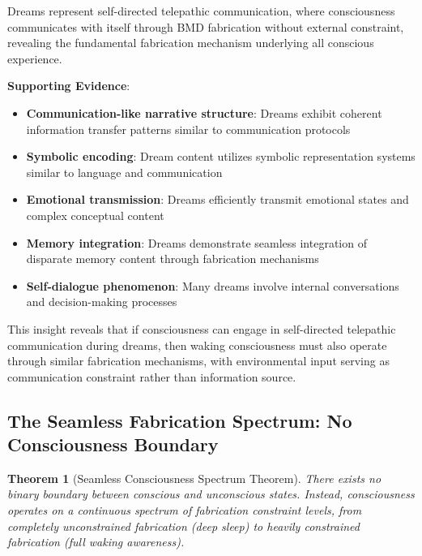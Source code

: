 \documentclass[12pt,a4paper]{article}
\newtheorem{theorem}{Theorem}[section]
\begin{document}
\begin{hypothesis}
Dreams represent self-directed telepathic communication, where consciousness communicates with itself through BMD fabrication without external constraint, revealing the fundamental fabrication mechanism underlying all conscious experience.
\end{hypothesis}

\textbf{Supporting Evidence}:
\begin{itemize}
\item \textbf{Communication-like narrative structure}: Dreams exhibit coherent information transfer patterns similar to communication protocols
\item \textbf{Symbolic encoding}: Dream content utilizes symbolic representation systems similar to language and communication
\item \textbf{Emotional transmission}: Dreams efficiently transmit emotional states and complex conceptual content  
\item \textbf{Memory integration}: Dreams demonstrate seamless integration of disparate memory content through fabrication mechanisms
\item \textbf{Self-dialogue phenomenon}: Many dreams involve internal conversations and decision-making processes
\end{itemize}

This insight reveals that if consciousness can engage in self-directed telepathic communication during dreams, then waking consciousness must also operate through similar fabrication mechanisms, with environmental input serving as communication constraint rather than information source.

\subsection{The Seamless Fabrication Spectrum: No Consciousness Boundary}

\begin{theorem}[Seamless Consciousness Spectrum Theorem]
There exists no binary boundary between conscious and unconscious states. Instead, consciousness operates on a continuous spectrum of fabrication constraint levels, from completely unconstrained fabrication (deep sleep) to heavily constrained fabrication (full waking awareness).
\end{theorem}
\end{document}
